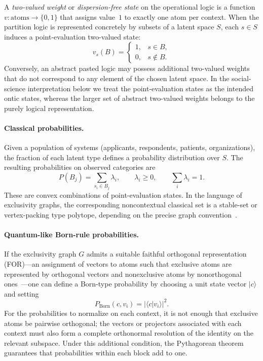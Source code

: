 \documentclass{article}
\begin{document}
A \emph{two-valued weight} or \emph{dispersion-free state} on the
operational logic is a function
$v \colon \text{atoms} \to \{0,1\}$ that assigns value~$1$ to
exactly one atom per context. When the partition logic is represented
concretely by subsets of a latent space $S$, each $s\in S$ induces a
point-evaluation two-valued state:
\[
v_s(B)=
\begin{cases}
1, & s\in B,\\
0, & s\notin B.
\end{cases}
\]
Conversely, an abstract pasted logic may possess additional
two-valued weights that do not correspond to any element of the
chosen latent space. In the social-science interpretation below we
treat the point-evaluation states as the intended ontic states,
whereas the larger set of abstract two-valued weights belongs to
the purely logical representation.

\paragraph{Classical probabilities.}
Given a population of systems (applicants, respondents, patients,
organizations), the fraction of each latent type defines a
probability distribution over $S$. The resulting probabilities on
observed categories are
\[
P(B_j) = \sum_{s_i\in B_j}\lambda_i,
\qquad
\lambda_i\geq 0,\qquad
\sum_i \lambda_i=1.
\]
These are convex combinations of point-evaluation states. In the
language of exclusivity graphs, the corresponding noncontextual
classical set is a stable-set or vertex-packing type polytope,
depending on the precise graph convention~\cite{GroetschelLovaszSchrijver1986}.

\paragraph{Quantum-like Born-rule probabilities.}
If the exclusivity graph $G$ admits a suitable faithful orthogonal
representation (FOR)---an assignment of vectors to atoms such that
exclusive atoms are represented by orthogonal vectors and
nonexclusive atoms by nonorthogonal ones~\cite{lovasz-79,
Cabello-2014-gtatqc}---one can define a Born-type probability by
choosing a unit state vector $|c\rangle$ and setting
\begin{equation}
P_{\text{Born}}(c,v_i)=|\langle c|v_i\rangle|^2.
\label{eq:born}
\end{equation}
For the probabilities to normalize on each context, it is not enough
that exclusive atoms be pairwise orthogonal; the vectors or
projectors associated with each context must also form a complete
orthonormal resolution of the identity on the relevant subspace.
Under this additional condition, the Pythagorean theorem guarantees
that probabilities within each block add to one.
\end{document}

